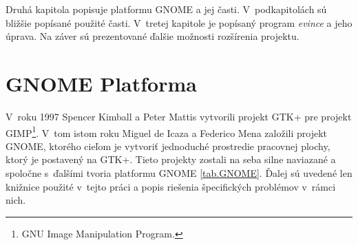 \documentclass[12pt,oneside,final]{fithesis2}
\begin{document}
Druhá kapitola popisuje platformu GNOME a jej časti. V~podkapitolách sú bližšie popísané použité časti. V~tretej kapitole je popísaný program \emph{evince} a jeho úprava. Na záver sú prezentované ďalšie možnosti rozšírenia projektu.

\chapter{GNOME Platforma}
V~roku 1997 Spencer Kimball a Peter Mattis vytvorili projekt GTK+ pre projekt GIMP\footnote{GNU Image Manipulation Program.}. V~tom istom roku Miguel de Icaza a Federico Mena založili projekt GNOME, ktorého cieľom je vytvoriť jednoduché prostredie pracovnej plochy, ktorý je postavený na GTK+. Tieto projekty zostali na seba silne naviazané a spoločne s~ďalšími tvoria platformu GNOME \ref{tab.GNOME}. Ďalej sú uvedené len knižnice použité v~tejto práci a popis riešenia špecifických problémov v~rámci nich.
\end{document}
